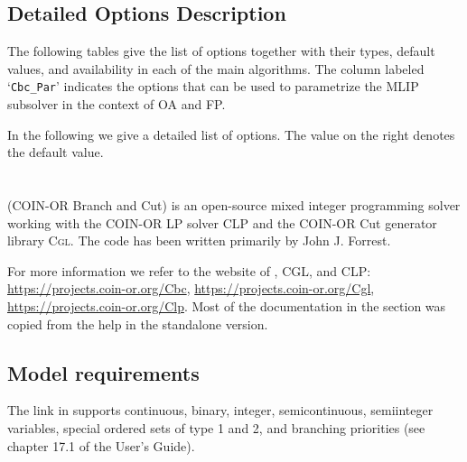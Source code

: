 \subsection{Detailed Options Description}
\label{sub:bonminalloptions}

The following tables give the list of options together with their types, default values, and availability in each of the main algorithms.
The column labeled `\texttt{Cbc\_Par}' indicates the options that can be used to parametrize the MLIP subsolver in the context of OA and FP.



In the following we give a detailed list of \BONMIN options.
The value on the right denotes the default value.


\section{\CBC}
\label{sec:coincbc}
\hypertarget{sec:coincbc}{}


\CBC (COIN-OR Branch and Cut) is an open-source mixed integer programming solver working with the COIN-OR LP solver \textsc{CLP} and the COIN-OR Cut generator library \textsc{Cgl}.
The code has been written primarily by John J. Forrest.

For more information we refer to the website of \CBC, \textsc{CGL}, and \textsc{CLP}:
\url{https://projects.coin-or.org/Cbc}, \url{https://projects.coin-or.org/Cgl}, \url{https://projects.coin-or.org/Clp}.
Most of the \CBC documentation in the section was copied from the help in the \CBC standalone version.

\subsection{Model requirements}

The \CBC link in \GAMS supports continuous, binary, integer, semicontinuous, semiinteger variables, special ordered sets of type 1 and 2, and branching priorities (see chapter 17.1 of the \GAMS User's Guide).

